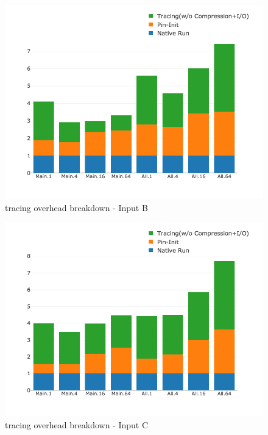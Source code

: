 \begin{figure}[t]
\centering
\includegraphics[width=.7\textwidth]{parlot/figs.comet.newMed/comet_chartDet_B_woc_byTool_p3_5.png}
\caption{\parlotnc tracing overhead breakdown - Input B}
\label{comet_chartDet_B_woc_byTool_p3_5}
\end{figure}

\begin{figure}[t]
\centering
\includegraphics[width=.7\textwidth]{parlot/figs.comet.newMed/comet_chartDet_C_woc_byTool_p3_5.png}
\caption{ \parlotnc tracing overhead breakdown - Input C}
\label{comet_chartDet_C_woc_byTool_p3_5}
\end{figure}
